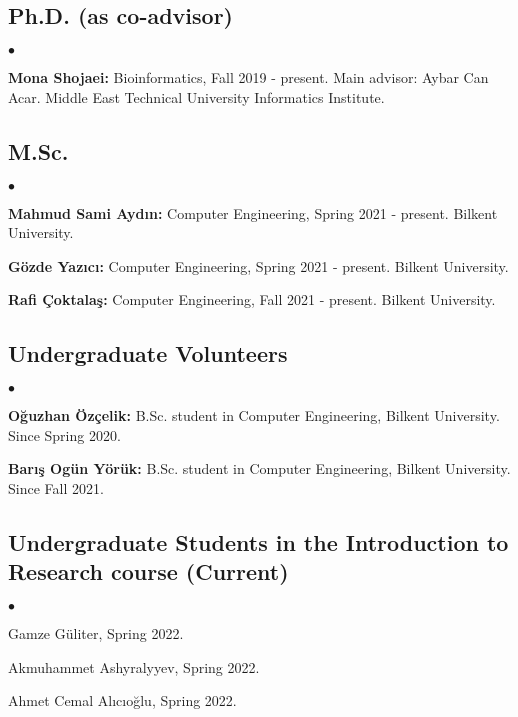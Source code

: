 \documentclass[margin,line]{res}
\newenvironment{list2}{
  \begin{list}{$\bullet$}{%
      \setlength{\itemsep}{0.1cm}
      \setlength{\parsep}{0in} \setlength{\parskip}{0in}
      \setlength{\topsep}{0in} \setlength{\partopsep}{0in} 
      \setlength{\leftmargin}{0.2in}}}{\end{list}}
\begin{document}
\begin{resume}
\subsection{\small \sc Ph.D. (as co-advisor)}
\begin{list2}
\item
{\bf Mona Shojaei:} Bioinformatics,  Fall 2019 - present.
Main advisor: Aybar Can Acar.
  Middle East Technical University Informatics Institute.
\end{list2}

\vspace*{-.4cm}
\subsection{\small \sc M.Sc.}
\begin{list2}
\item
  {\bf Mahmud Sami Aydın:} Computer Engineering, Spring 2021 - present.
  Bilkent University. 
  \item
  {\bf Gözde Yazıcı:} Computer Engineering, Spring 2021 - present.
  Bilkent University. 
  \item
  {\bf Rafi Çoktalaş:} Computer Engineering, Fall 2021 - present.
  Bilkent University. 
\end{list2}

\vspace*{-.4cm}
  \subsection{\small \sc Undergraduate Volunteers}
  \begin{list2}
\item {\bf Oğuzhan Özçelik:} B.Sc. student in Computer Engineering,  Bilkent University. Since Spring 2020.
\item {\bf Barış Ogün Yörük:} B.Sc. student in Computer Engineering,  Bilkent University. Since Fall 2021.

    \end{list2}
\vspace*{-.4cm}    
  \subsection{\small \sc Undergraduate Students in the Introduction to Research course (Current)}
 \begin{list2}  
 \item Gamze Güliter, Spring 2022.
 \item Akmuhammet Ashyralyyev, Spring 2022.
 \item Ahmet Cemal Alıcıoğlu, Spring 2022.
 \end{list2}


\end{resume}
\end{document}
